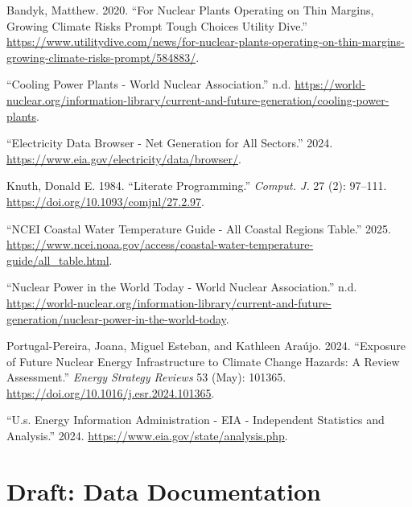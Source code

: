\documentclass[
  letterpaper,
  DIV=11,
  numbers=noendperiod]{scrreprt}
\newlength{\cslhangindent}
\newenvironment{CSLReferences}[2] %
 {\begin{list}{}{%
  \setlength{\itemindent}{0pt}
  \setlength{\leftmargin}{0pt}
  \setlength{\parsep}{0pt}
  \ifodd #1
   \setlength{\leftmargin}{\cslhangindent}
   \setlength{\itemindent}{-1\cslhangindent}
  \fi
  \setlength{\itemsep}{#2\baselineskip}}}
 {\end{list}}
\begin{document}
\label{refs}
\begin{CSLReferences}{1}{0}
Bandyk, Matthew. 2020. {``For Nuclear Plants Operating on Thin Margins,
Growing Climate Risks Prompt Tough Choices \textbar{} Utility Dive.''}
\url{https://www.utilitydive.com/news/for-nuclear-plants-operating-on-thin-margins-growing-climate-risks-prompt/584883/}.

{``Cooling Power Plants - World Nuclear Association.''} n.d.
\url{https://world-nuclear.org/information-library/current-and-future-generation/cooling-power-plants}.

{``Electricity Data Browser - Net Generation for All Sectors.''} 2024.
\url{https://www.eia.gov/electricity/data/browser/}.

Knuth, Donald E. 1984. {``Literate Programming.''} \emph{Comput. J.} 27
(2): 97--111. \url{https://doi.org/10.1093/comjnl/27.2.97}.

{``NCEI Coastal Water Temperature Guide - All Coastal Regions Table.''}
2025.
\url{https://www.ncei.noaa.gov/access/coastal-water-temperature-guide/all_table.html}.

{``Nuclear Power in the World Today - World Nuclear Association.''} n.d.
\url{https://world-nuclear.org/information-library/current-and-future-generation/nuclear-power-in-the-world-today}.

Portugal-Pereira, Joana, Miguel Esteban, and Kathleen Araújo. 2024.
{``Exposure of Future Nuclear Energy Infrastructure to Climate Change
Hazards: A Review Assessment.''} \emph{Energy Strategy Reviews} 53
(May): 101365. \url{https://doi.org/10.1016/j.esr.2024.101365}.

{``U.s. Energy Information Administration - EIA - Independent Statistics
and Analysis.''} 2024. \url{https://www.eia.gov/state/analysis.php}.

\end{CSLReferences}

\cleardoublepage
{}
{}
\appendix

\chapter{Draft: Data Documentation}\label{draft-data-documentation}
\end{document}
